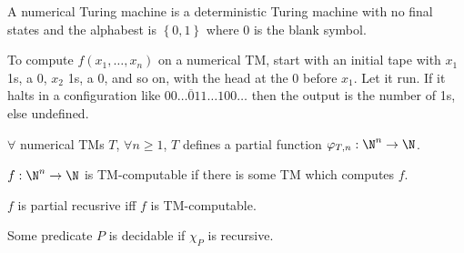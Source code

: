 \documentclass{article}
\begin{document}
\begin{definition}
    A numerical Turing machine is a
    deterministic Turing machine
    with no final states
    and the alphabest is \(\left\{ 0, 1 \right\}\)
    where \(0\) is the blank symbol.
\end{definition}
\begin{theorem}
    To compute \(f(x_1, \ldots, x_n)\) on a numerical TM,
    start with an initial tape with \(x_1\) 1s, a 0, \(x_2\) 1s, a 0, and so on,
    with the head at the 0 before \(x_1\).
    Let it run.
    If it halts in a configuration like \(00\ldots \overline{0}11\ldots 100\ldots \)
    then the output is the number of 1s, else undefined.
\end{theorem}
\begin{theorem}
    \(\forall\) numerical TMs \(T\),
    \(\forall n \ge 1\), \(T\) defines a partial function
    \(\varphi_{T,n}:\N^n\to\N\).
\end{theorem}
\begin{theorem}
    \(f:\N^n\to\N\) is TM-computable if
    there is some TM which computes \(f\).
\end{theorem}
\begin{theorem}
    \(f\) is partial recusrive iff \(f\) is TM-computable.
\end{theorem}
\begin{definition}[Decidable]
    Some predicate \(P\) is decidable if \(\chi_P\)
    is recursive.
\end{definition}
\end{document}
